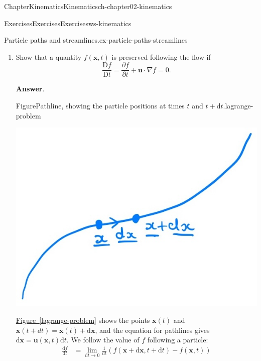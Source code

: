 \documentclass[oneside,10pt,]{book}
\newcommand{\blocktitlefont}{\relax}
\newcommand{\xreffont}{\relax}
\numberwithin{equation}{section}
\newcommand{\de}{\mathrm{d}}
\newcommand{\dd}[2]{\frac{\de#1}{\de#2}}
\newcommand{\DD}[2]{\frac{\mathrm{D}#1}{\mathrm{D}#2}}
\newcommand{\pd}[2]{\frac{\partial#1}{\partial#2}}
\newcommand{\bx}{\boldsymbol{x}}
\newcommand{\bu}{\boldsymbol{u}}
\begin{document}
\begin{chapterptx}{Chapter}{Kinematics}{}{Kinematics}{}{}{ch-chapter02-kinematics}
\begin{exercises-section}{Exercises}{Exercises}{}{Exercises}{}{}{ws-kinematics}
\begin{divisionexercise}{5}{Particle paths and streamlines.}{}{ex-particle-paths-streamlines}
\begin{enumerate}[font=\bfseries,label=(\alph*),ref=\alph*]
\begin{equation*}
\dd{\bx}{t} = \bu(\bx,t).
\end{equation*}
Streamlines are curves that are instantaneously tangent to the velocity field, and therefore satisfy%
\begin{equation*}
\dd{\bx}{s} = \bu(\bx,t),
\end{equation*}
where \(s\) is a parameter along the streamline. The two coincide if the flow is steady, i.e. \(\bu(\bx,t)=\bu(\bx)\).%
\item{}Show that a quantity \(f(\bx,t)\) is preserved following the flow if%
\begin{equation*}
\DD{f}{t}=\pd{f}{t}+\bu\cdot\nabla f=0.
\end{equation*}
%
\par\smallskip%
\noindent\textbf{\blocktitlefont Answer}.\hypertarget{ex-particle-paths-streamlines-3-2}{}\quad{}\begin{figureptx}{Figure}{Pathline, showing the particle positions at times \(t\) and \(t+\de t\).}{lagrange-problem}{}%
\begin{image}{0.1}{0.8}{0.1}{}%
\includegraphics[width=\linewidth]{external/ch-chapter02-lagrange-problem2.jpg}
\end{image}%
\tcblower
\end{figureptx}%
\hyperref[lagrange-problem]{Figure~{\xreffont\ref{lagrange-problem}}} shows the points \(\bx(t)\) and \(\bx(t+dt)=\bx(t)+\de\bx\), and the equation for pathlines gives \(\de\bx=\bu(\bx,t)\de t\). We follow the value of \(f\) following a particle:%
\begin{align*}
\dd{f}{t}&=\lim_{\de t\rightarrow0}\frac1{\de t}\left(f(\bx+\de\bx,t+\de t)-f(\bx,t)\right)\\

\end{align*}
\end{enumerate}
\end{divisionexercise}
\end{exercises-section}
\end{chapterptx}
\end{document}
